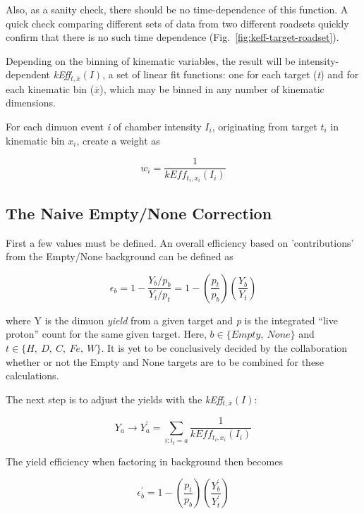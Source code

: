 Also, as a sanity check, there should be no time-dependence of this function. A quick check comparing different sets of data from two different roadsets quickly confirm that there is no such time dependence (Fig.~\ref{fig:keff-target-roadset}).

Depending on the binning of kinematic variables, the result will be intensity-dependent \emph{kEff}$_{t,\bar{x}}(I)$, a set of linear fit functions: one for each target (\emph{t}) and for each kinematic bin ($\bar{x}$), which may be binned in any number of kinematic dimensions.

For each dimuon event \emph{i} of chamber intensity $I_i$, originating from target $t_i$ in kinematic bin $x_i$, create a weight as

\begin{equation}
w_i = \frac{1}{kEff_{t_i, x_i}(I_i)}
\end{equation}

\subsection{The Naive Empty/None Correction}

First a few values must be defined. An overall efficiency based on 'contributions' from the Empty/None background can be defined as

\begin{equation}
\epsilon_b = 1 - \frac{Y_b/p_b}{Y_t/p_t} = 1 - \left(\frac{p_t}{p_b}\right) \left( \frac{Y_b}{Y_t} \right)
\end{equation}

where Y is the dimuon \emph{yield} from a given target and \emph{p} is the integrated ``live proton'' count for the same given target. Here, $b \in \{Empty,\ None\}$ and $t\in\{H,\ D,\ C,\ Fe,\ W\}$. It is yet to be conclusively decided by the collaboration whether or not the Empty and None targets are to be combined for these calculations.

The next step is to adjust the yields with the \emph{kEff}$_{t,\bar{x}}(I)$:

\begin{equation}
Y_a \rightarrow Y_a^\prime = \sum_{i:i_t=a} \frac{1}{kEff_{t_i, x_i}(I_i)}
\end{equation}

The yield efficiency when factoring in background then becomes

\begin{equation}
\epsilon^\prime_b = 1 - \left(\frac{p_t}{p_b}\right) \left( \frac{Y^\prime_b}{Y^\prime_t} \right)
\end{equation}

